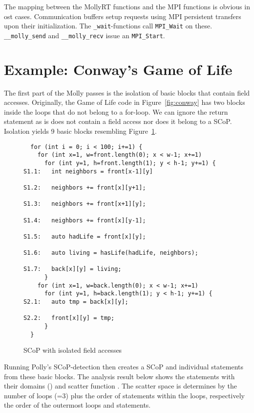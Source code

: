\documentclass{sigplanconf}
\begin{document}
The mapping between the MollyRT functions and the MPI functions is obvious in ost cases. Communication buffers setup requests using MPI persistent transfers upon their initialization. The \texttt{\_wait}-functions call \texttt{MPI\_Wait} on these. \texttt{\_\_molly\_send} and \texttt{\_\_molly\_recv} issue an \texttt{MPI\_Start}.


\section{Example: Conway's Game of Life}\label{sct:conways}

The first part of the Molly passes is the isolation of basic blocks that contain field accesses. Originally, the Game of Life code in Figure~\ref{fig:conway} has two blocks inside the loops that do not belong to a for-loop. We can ignore the return statement as is does not contain a field access nor does it belong to a SCoP. Isolation yields 9 basic blocks resembling Figure~\ref{fig:isolated}.

\begin{figure}[htb]
{\small
\begin{verbatim}
  for (int i = 0; i < 100; i+=1) {
    for (int x=1, w=front.length(0); x < w-1; x+=1)
      for (int y=1, h=front.length(1); y < h-1; y+=1) {
S1.1:   int neighbors = front[x-1][y] 

S1.2:   neighbors += front[x][y+1];
         
S1.3:   neighbors += front[x+1][y];
        
S1.4:   neighbors += front[x][y-1];  
         
S1.5:   auto hadLife = front[x][y];
         
S1.6:   auto living = hasLife(hadLife, neighbors);  
            
S1.7:   back[x][y] = living;       
      }
    for (int x=1, w=back.length(0); x < w-1; x+=1)
      for (int y=1, h=back.length(1); y < h-1; y+=1) {
S2.1:   auto tmp = back[x][y];
      
S2.2:   front[x][y] = tmp;
      }
  }
\end{verbatim}
}
\caption{SCoP with isolated field accesses}\label{fig:isolated}
\end{figure}

Running Polly's SCoP-detection then creates a SCoP and individual statements from these basic blocks. The analysis result below shows the statements with their domains () and scatter function . The scatter space  is determines by the number of loops (=3) plus the order of statements within the loops, respectively the order of the outermost loops and statements.
\end{document}
